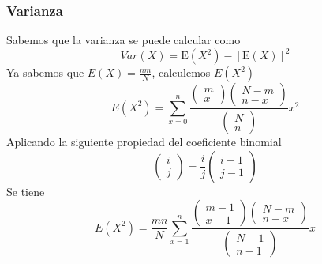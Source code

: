 \documentclass[12pt]{article}
\begin{document}
            \subsubsection{Varianza}
            	Sabemos que la varianza se puede calcular como
                \begin{equation}
                \label{eq:var1}
                	Var\left( X \right)=\mbox{E}\left( X^{2} \right)-\left[ \mbox{E}\left( X \right) \right]^{2}
                \end{equation}
                Ya sabemos que $E(X) = \frac{nm}{N}$, calculemos $E(X^2)$
                \begin{equation*}
                	E(X^2)= \sum _{ x=0 }^{ n }{ \frac { \left( \begin{matrix} m \\ x \end{matrix} \right) \left( \begin{matrix} N-m \\ n-x \end{matrix} \right)  }{ \left( \begin{matrix} N \\ n \end{matrix} \right)  } { x }^{ 2 } } 
                \end{equation*}
                Aplicando la siguiente propiedad del coeficiente binomial
                \begin{equation*}
                	\left( \begin{matrix} i \\ j \end{matrix} \right) =\frac { i }{ j } \left( \begin{matrix} i-1 \\ j-1 \end{matrix} \right) 
                \end{equation*}
            	Se tiene
                \begin{equation*}
                	E(X^2)=\frac { mn }{ N } \sum _{ x=1 }^{ n }{ \frac { \left( \begin{matrix} m-1 \\ x-1 \end{matrix} \right) \left( \begin{matrix} N-m \\ n-x \end{matrix} \right)  }{ \left( \begin{matrix} N-1 \\ n-1 \end{matrix} \right)  } { x } } 
                \end{equation*}
\end{document}
